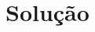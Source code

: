 \documentclass[12pt,compress,final]{beamer}
\begin{document}
% 
% 
% 
% 


\section{Solução} %



\end{document}
